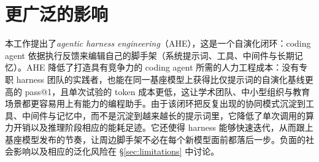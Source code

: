 \section{更广泛的影响}
\label{app:broader-impact}

本工作提出了\emph{agentic harness engineering}（AHE），这是一个自演化闭环：coding agent 依据执行反馈来编辑自己的脚手架（系统提示词、工具、中间件与长期记忆）。AHE 降低了打造具有竞争力的 coding agent 所需的人力工程成本：没有专职 harness 团队的实践者，也能在同一基座模型上获得比仅提示词的自演化基线更高的 pass@1，且单次试验的 token 成本更低，这让学术团队、中小型组织与教育场景都更容易用上有能力的编程助手。由于该闭环把反复出现的协同模式沉淀到工具、中间件与记忆中，而不是沉淀到越来越长的提示词里，它降低了单次调用的算力开销以及推理阶段相应的能耗足迹。它还使得 harness 能够快速迭代，从而跟上基座模型发布的节奏，让周边脚手架不必在每个新模型面前都落后一步。负面的社会影响以及相应的泛化风险在 \S\ref{sec:limitations} 中讨论。
